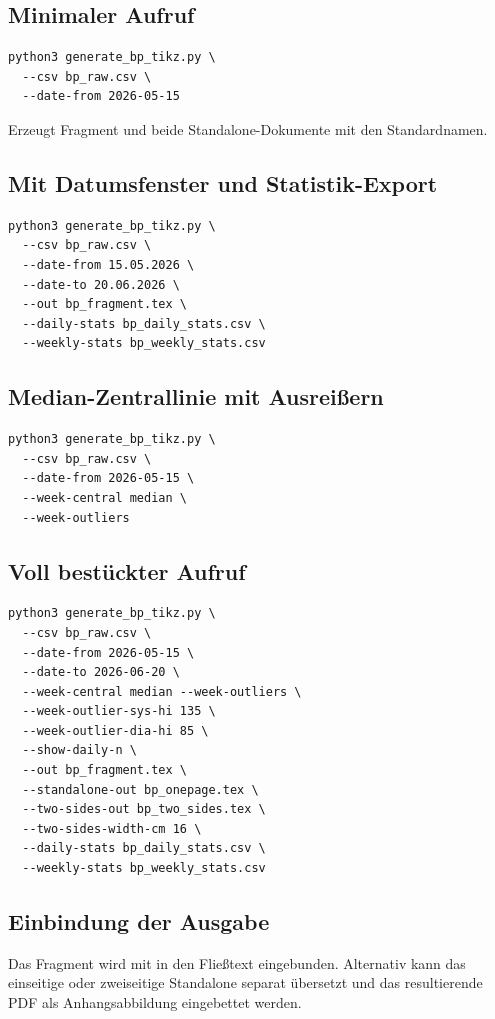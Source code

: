 \documentclass[conference]{IEEEtran}
\begin{document}
\subsection{Minimaler Aufruf}
\begin{lstlisting}[style=sh]
python3 generate_bp_tikz.py \
  --csv bp_raw.csv \
  --date-from 2026-05-15
\end{lstlisting}
Erzeugt Fragment und beide Standalone-Dokumente mit den Standardnamen.

\subsection{Mit Datumsfenster und Statistik-Export}
\begin{lstlisting}[style=sh]
python3 generate_bp_tikz.py \
  --csv bp_raw.csv \
  --date-from 15.05.2026 \
  --date-to 20.06.2026 \
  --out bp_fragment.tex \
  --daily-stats bp_daily_stats.csv \
  --weekly-stats bp_weekly_stats.csv
\end{lstlisting}

\subsection{Median-Zentrallinie mit Ausreißern}
\begin{lstlisting}[style=sh]
python3 generate_bp_tikz.py \
  --csv bp_raw.csv \
  --date-from 2026-05-15 \
  --week-central median \
  --week-outliers
\end{lstlisting}

\subsection{Voll bestückter Aufruf}
\begin{lstlisting}[style=sh]
python3 generate_bp_tikz.py \
  --csv bp_raw.csv \
  --date-from 2026-05-15 \
  --date-to 2026-06-20 \
  --week-central median --week-outliers \
  --week-outlier-sys-hi 135 \
  --week-outlier-dia-hi 85 \
  --show-daily-n \
  --out bp_fragment.tex \
  --standalone-out bp_onepage.tex \
  --two-sides-out bp_two_sides.tex \
  --two-sides-width-cm 16 \
  --daily-stats bp_daily_stats.csv \
  --weekly-stats bp_weekly_stats.csv
\end{lstlisting}

\subsection{Einbindung der Ausgabe}
Das Fragment wird mit \verb|| in den Fließtext
eingebunden. Alternativ kann das einseitige oder zweiseitige Standalone separat
übersetzt und das resultierende PDF als Anhangsabbildung eingebettet werden.
\end{document}
